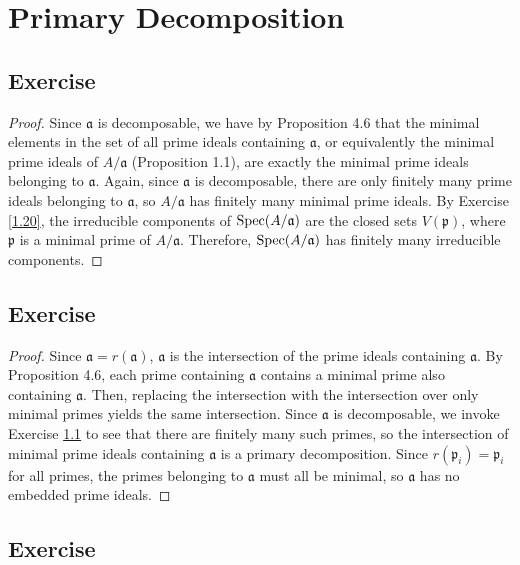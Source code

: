 \section{Primary Decomposition}

\subsection{Exercise}\label{4.1}

\begin{proof}
Since $\mathfrak{a}$ is decomposable, we have by Proposition 4.6 that the minimal elements in the set of all prime ideals containing $\mathfrak{a}$, or equivalently the minimal prime ideals of $A/\mathfrak{a}$ (Proposition 1.1),
are exactly the minimal prime ideals belonging to $\mathfrak{a}$. Again, since $\mathfrak{a}$ is decomposable, there are only finitely many prime ideals belonging to $\mathfrak{a}$, so $A/\mathfrak{a}$
has finitely many minimal prime ideals. By Exercise \ref{1.20}, the irreducible components of $\operatorname{Spec}(A/\mathfrak{a})$ are the closed sets $V(\mathfrak{p})$, where $\mathfrak{p}$ is a minimal prime of $A/\mathfrak{a}$.
Therefore, $\operatorname{Spec}(A/\mathfrak{a})$ has finitely many irreducible components.
\end{proof}

\subsection{Exercise}\label{4.2}

\begin{proof}
Since $\mathfrak{a} = r(\mathfrak{a})$, $\mathfrak{a}$ is the intersection of the prime ideals containing $\mathfrak{a}$. By Proposition 4.6, each prime containing $\mathfrak{a}$ contains a minimal prime also containing 
$\mathfrak{a}$. Then, replacing the intersection with the intersection over only minimal primes yields the same intersection. Since $\mathfrak{a}$ is decomposable, we invoke Exercise \ref{4.1} to see that there are finitely 
many such primes, so the intersection of minimal prime ideals containing $\mathfrak{a}$ is a primary decomposition. Since $r(\mathfrak{p}_i) = \mathfrak{p}_i$ for all primes, the primes belonging to $\mathfrak{a}$ must 
all be minimal, so $\mathfrak{a}$ has no embedded prime ideals.
\end{proof}

\subsection{Exercise}\label{4.3}

